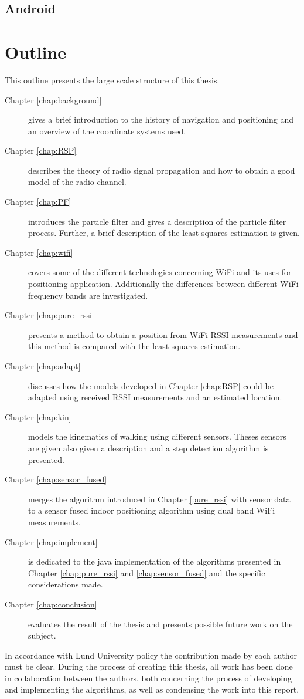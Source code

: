 \documentclass{LTHthesis}
\begin{document}
\subsection{Android} 
%

%
\section{Outline}
%
This outline presents the large scale structure of this thesis.
%
\begin{description}
\item[Chapter \ref{chap:background}] gives a brief introduction to the history of navigation and positioning and an overview of the coordinate systems used.  
%
\item[Chapter \ref{chap:RSP}] describes the theory of radio signal propagation and how to obtain a good model of the radio channel. 
%
\item[Chapter \ref{chap:PF}] introduces the particle filter and gives a description of the particle filter process. Further, a brief description of the least squares estimation is given. 
%
\item[Chapter \ref{chap:wifi}] covers some of the different technologies concerning WiFi and its uses for positioning application. Additionally the differences between different WiFi frequency bands are investigated. 
%
\item[Chapter \ref{chap:pure_rssi}] presents a method to obtain a position from WiFi RSSI measurements and this method is compared with the least squares estimation.  
%
\item[Chapter \ref{chap:adapt}] discusses how the models developed in Chapter \ref{chap:RSP} could be adapted using received RSSI measurements and an estimated location. 
%
\item[Chapter \ref{chap:kin}] models the kinematics of walking using different sensors. Theses sensors are given also given a description and a step detection algorithm is presented. 
%
\item[Chapter \ref{chap:sensor_fused}] merges the algorithm introduced in Chapter \ref{pure_rssi} with sensor data to a sensor fused indoor positioning algorithm using dual band WiFi measurements.
%
\item[Chapter \ref{chap:implement}] is dedicated to the java implementation of the algorithms presented in Chapter \ref{chap:pure_rssi} and \ref{chap:sensor_fused} and the specific considerations made. 
%
\item[Chapter \ref{chap:conclusion}] evaluates the result of the thesis and presents possible future work on the subject. 
%
\end{description}
%
In accordance with Lund University policy the contribution made by each author must be clear. During the process of creating this thesis, all work has been done in collaboration between the authors, both concerning the process of developing and implementing the algorithms, as well as condensing the work into this report. 
%
\end{document}
